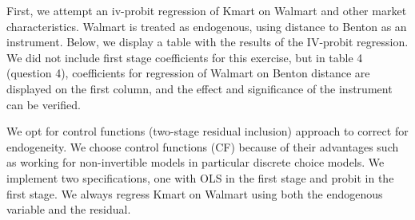 \documentclass{article}
\theoremstyle{definition}
\begin{document}
First, we attempt an iv-probit regression of Kmart on Walmart and other market characteristics. Walmart is treated as endogenous, using distance to Benton as an instrument. Below, we display a table with the results of the IV-probit regression. We did not include first stage coefficients for this exercise, but in table 4 (question 4), coefficients for regression of Walmart on Benton distance are displayed on the first column, and the effect and significance of the instrument can be verified. 

We opt for control functions (two-stage residual inclusion) approach to correct for endogeneity.  We choose control functions (CF) because of their advantages such as working for non-invertible models in particular discrete choice models. We implement two specifications,  one with OLS in the first stage and probit in the first stage. We always regress Kmart on Walmart using both the endogenous variable and the residual. 
\end{document}
